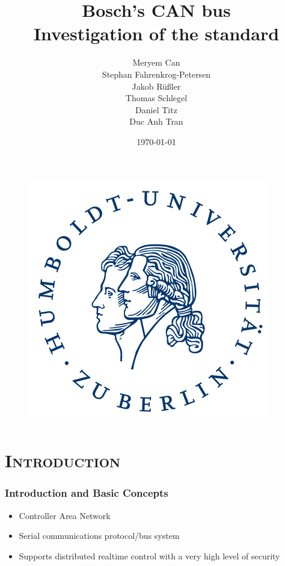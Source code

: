 \documentclass[xcolor=x11names,compress]{beamer}
\renewcommand{\(}{\begin{columns}}
\renewcommand{\)}{\end{columns}}
\newcommand{\<}[1]{\begin{column}{#1}}
\renewcommand{\>}{\end{column}}
\begin{document}
\begin{frame}[plain]
  \begin{figure}
    \flushright
      \includegraphics[scale=0.12]{hu_logo}
    \vspace*{-0.4cm}
  \end{figure}

  \title{\textbf{Bosch's CAN bus\\Investigation of the standard}\\\vspace{0.2cm}}

  \author{Meryem Can\\Stephan Fahrenkrog-Petersen\\Jakob Rüßler\\Thomas Schlegel\\
  Daniel Titz\\Duc Anh Tran\\\vspace{0.3cm}}


\date{\today}
\titlepage
\end{frame}


\section{\scshape Introduction}
\begin{frame}
  \frametitle{Introduction and Basic Concepts}
  \begin{itemize}
      \item Controller Area Network~\cite{can}
      \item Serial communications protocol/bus system
      \item Supports distributed realtime control with a very high level of security 
   
  \end{itemize}

\end{frame}
\end{document}
